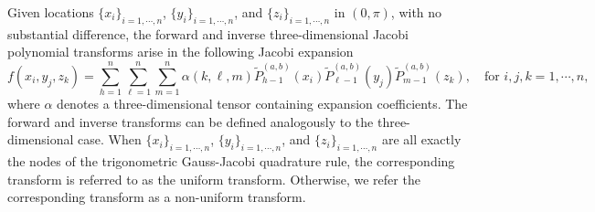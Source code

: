 \documentclass[11pt]{article}
\begin{document}
Given locations $\{x_{i}\}_{i=1,\cdots,n}$, $\{y_{i}\}_{i=1,\cdots,n}$, and $\{z_{i}\}_{i=1,\cdots,n}$ in $(0,\pi)$, with no substantial difference, the forward and inverse three-dimensional Jacobi
polynomial transforms arise in the following Jacobi expansion
\begin{equation}
\label{eq:3Djac}
f(x_i,y_j,z_k) = \sum\limits_{h=1}^{n}\sum\limits_{\ell=1}^{n}\sum\limits_{m=1}^{n}\alpha(k,\ell,m)\tilde{P}_{h-1}^{(a,b)}(x_{i})\tilde{P}_{\ell-1}^{(a,b)}(y_{j})\tilde{P}_{m-1}^{(a,b)}(z_{k}),\quad\text{for } i,j,k = 1,\cdots,n,
\end{equation}
where $\alpha$ denotes a three-dimensional tensor containing expansion coefficients. The forward and inverse transforms can be defined analogously to the three-dimensional case. When $\{x_{i}\}_{i=1,\cdots,n}$, $\{y_{i}\}_{i=1,\cdots,n}$, and $\{z_{i}\}_{i=1,\cdots,n}$ are all exactly the nodes of the trigonometric Gauss-Jacobi quadrature rule, the corresponding transform is referred to as the uniform transform. Otherwise, we refer the corresponding transform as a non-uniform transform. 
\end{document}
